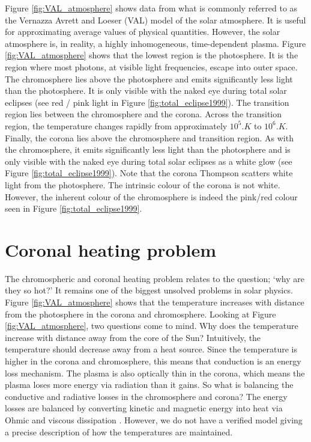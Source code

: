 Figure \ref{fig:VAL_atmosphere} shows data from what is commonly referred to as the Vernazza Avrett and Loeser (VAL) \citep{Vernazza1981} model of the solar atmosphere. It is useful for approximating average values of physical quantities. However, the solar atmosphere is, in reality, a highly inhomogeneous, time-dependent plasma. Figure \ref{fig:VAL_atmosphere} shows that the lowest region is the photosphere. It is the region where most photons, at visible light frequencies, escape into outer space. The chromosphere lies above the photosphere and emits significantly less light than the photosphere. It is only visible with the naked eye during total solar eclipses (see red / pink light in Figure \ref{fig:total_eclipse1999}). The transition region lies between the chromosphere and the corona. Across the transition region, the temperature changes rapidly from approximately $10^5\si{.K}$ to $10^6\si{.K}$. Finally, the corona lies above the chromosphere and transition region. As with the chromosphere, it emits significantly less light than the photosphere and is only visible with the naked eye during total solar eclipses as a white glow (see Figure \ref{fig:total_eclipse1999}). Note that the corona Thompson scatters white light from the photosphere. The intrinsic colour of the corona is not white. However, the inherent colour of the chromosphere is indeed the pink/red colour seen in Figure \ref{fig:total_eclipse1999}.

\section{Coronal heating problem}
\label{sec:coronal_heating_problem}

The chromospheric and coronal heating problem relates to the question; `why are they so hot?' It remains one of the biggest unsolved problems in solar physics. Figure \ref{fig:VAL_atmosphere} shows that the temperature increases with distance from the photosphere in the corona and chromosphere. Looking at Figure \ref{fig:VAL_atmosphere}, two questions come to mind. Why does the temperature increase with distance away from the core of the Sun? Intuitively, the temperature should decrease away from a heat source. Since the temperature is higher in the corona and chromosphere, this means that conduction is an energy loss mechanism. The plasma is also optically thin in the corona, which means the plasma loses more energy via radiation than it gains. So what is balancing the conductive and radiative losses in the chromosphere and corona?
The energy losses are balanced by converting kinetic and magnetic energy into heat via Ohmic and viscous dissipation \citep{Klimchuk2015}. However, we do not have a verified model giving a precise description of how the temperatures are maintained.

